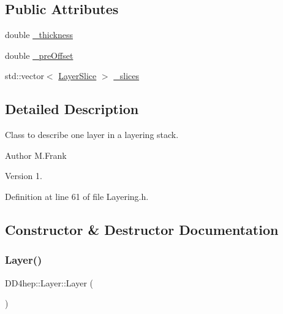 \subsection*{Public Attributes}
\begin{DoxyCompactItemize}
\item 
double \hyperlink{class_d_d4hep_1_1_layer_afe2f78c9d1a66a6956deded6c4f7a7e1}{\+\_\+thickness}
\item 
double \hyperlink{class_d_d4hep_1_1_layer_a1160c69a0ac9822a0cc9c0c0c7ceac73}{\+\_\+pre\+Offset}
\item 
std\+::vector$<$ \hyperlink{class_d_d4hep_1_1_layer_slice}{Layer\+Slice} $>$ \hyperlink{class_d_d4hep_1_1_layer_a45011afeb7fafcefe3de7275a50e5aaf}{\+\_\+slices}
\end{DoxyCompactItemize}


\subsection{Detailed Description}
Class to describe one layer in a layering stack. 

\begin{DoxyAuthor}{Author}
M.\+Frank 
\end{DoxyAuthor}
\begin{DoxyVersion}{Version}
1. 
\end{DoxyVersion}


Definition at line 61 of file Layering.\+h.



\subsection{Constructor \& Destructor Documentation}
\hypertarget{class_d_d4hep_1_1_layer_a23e603ff080b2c6e9a9016b401fdac20}{}\label{class_d_d4hep_1_1_layer_a23e603ff080b2c6e9a9016b401fdac20} 
\subsubsection{\texorpdfstring{Layer()}{Layer()}\hspace{0.1cm}{\footnotesize\ttfamily [1/2]}}
{\footnotesize\ttfamily D\+D4hep\+::\+Layer\+::\+Layer (\begin{DoxyParamCaption}{ }\end{DoxyParamCaption})\hspace{0.3cm}{\ttfamily [inline]}}



